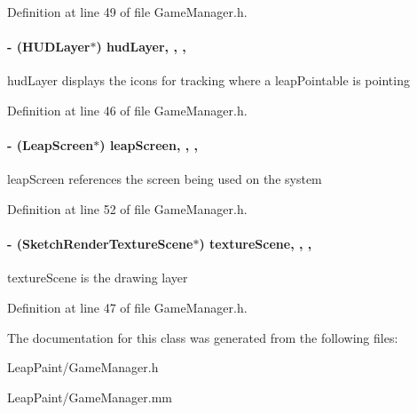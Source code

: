 Definition at line 49 of file Game\-Manager.\-h.

\hypertarget{interface_game_manager_ae286fb2f9d31810d73c7231a574b56b0}{
\paragraph[{hud\-Layer}]{\setlength{\rightskip}{0pt plus 5cm}-\/ ({\bf H\-U\-D\-Layer}$\ast$) hud\-Layer\hspace{0.3cm}{\ttfamily [read]}, {\ttfamily [write]}, {\ttfamily [nonatomic]}, {\ttfamily [strong]}}}\label{d4/d94/interface_game_manager_ae286fb2f9d31810d73c7231a574b56b0}
hud\-Layer displays the icons for tracking where a leap\-Pointable is pointing 

Definition at line 46 of file Game\-Manager.\-h.

\hypertarget{interface_game_manager_a85cb30e21c987f66855a762c6ba88096}{
\paragraph[{leap\-Screen}]{\setlength{\rightskip}{0pt plus 5cm}-\/ (Leap\-Screen$\ast$) leap\-Screen\hspace{0.3cm}{\ttfamily [read]}, {\ttfamily [write]}, {\ttfamily [nonatomic]}, {\ttfamily [strong]}}}\label{d4/d94/interface_game_manager_a85cb30e21c987f66855a762c6ba88096}
leap\-Screen references the screen being used on the system 

Definition at line 52 of file Game\-Manager.\-h.

\hypertarget{interface_game_manager_a79a86ff991f39b3007d99ca61af21253}{
\paragraph[{texture\-Scene}]{\setlength{\rightskip}{0pt plus 5cm}-\/ ({\bf Sketch\-Render\-Texture\-Scene}$\ast$) texture\-Scene\hspace{0.3cm}{\ttfamily [read]}, {\ttfamily [write]}, {\ttfamily [nonatomic]}, {\ttfamily [strong]}}}\label{d4/d94/interface_game_manager_a79a86ff991f39b3007d99ca61af21253}
texture\-Scene is the drawing layer 

Definition at line 47 of file Game\-Manager.\-h.



The documentation for this class was generated from the following files\-:\begin{DoxyCompactItemize}
\item 
Leap\-Paint/Game\-Manager.\-h\item 
Leap\-Paint/Game\-Manager.\-mm\end{DoxyCompactItemize}
